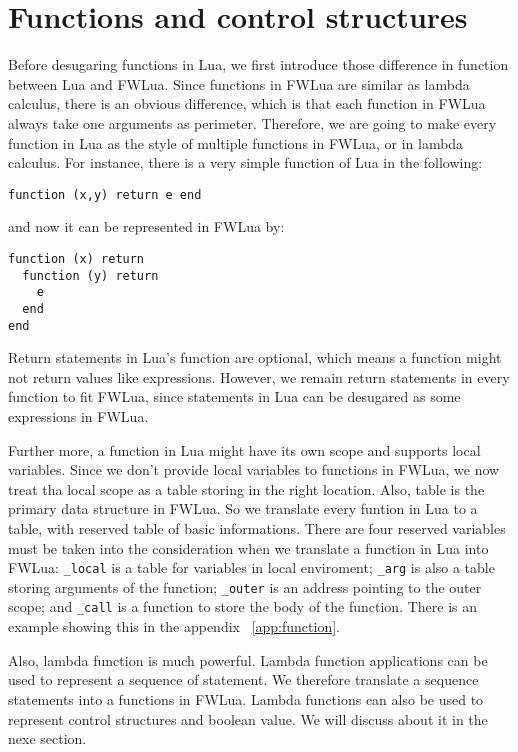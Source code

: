 \section{Functions and control structures}\label{sec:TraFunc}
Before desugaring functions in Lua, we first introduce those difference in function between Lua and FWLua. Since functions in FWLua are similar as lambda calculus, there is an obvious difference, which is that each function in FWLua always take one arguments as perimeter. Therefore, we are going to make every function in Lua as the style of multiple functions in FWLua, or in lambda calculus. For instance, there is a very simple function of Lua in the following:

\begin{verbatim}
function (x,y) return e end
\end{verbatim}

and now it can be represented in FWLua by:

\begin{verbatim}
function (x) return 
  function (y) return 
    e
  end
end
\end{verbatim}

Return statements in Lua's function are optional, which means a function might not return values like expressions. However, we remain return statements in every function to fit FWLua, since statements in Lua can be desugared as some expressions in FWLua. 

Further more, a function in Lua might have its own scope and supports local variables. 
Since we don't provide local variables to functions in FWLua, we now treat tha local scope as a table storing in the right location.
Also, table is the primary data structure in FWLua. So we translate every funtion in Lua to a table, with  reserved table of basic informations. There are four reserved variables must be taken into the consideration when we translate a function in Lua into FWLua: {\tt \_local} is a table for variables in local enviroment; {\tt \_arg} is also a table storing arguments of the function; {\tt \_outer} is an address pointing to the outer scope; and {\tt \_call} is a function to store the body of the function. There is an example showing this in the appendix ~\ref{app:function}.

Also, lambda function is much powerful. Lambda function applications can be used to represent a sequence of  statement. We therefore translate a sequence statements into a functions in FWLua. Lambda functions can also be used to represent control structures and boolean value. We will discuss about it in the nexe section.


